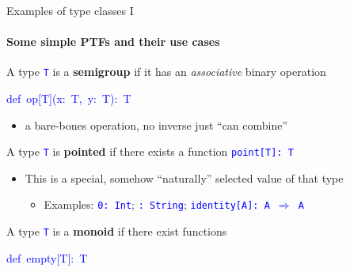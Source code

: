 \documentclass[english]{beamer}
\newenvironment{lyxcode}
   {\par\begin{list}{}{
     \setlength{\rightmargin}{\leftmargin}
     \setlength{\listparindent}{0pt}%
     \raggedright
     \setlength{\itemsep}{0pt}
     \setlength{\parsep}{0pt}
     \normalfont\ttfamily}%
    \def\{{\char`\{}
    \def\}{\char`\}}
    \def\textasciitilde{\char`\~}
    \item[]}
   {\end{list}}
\begin{document}
\begin{frame}{Examples of type classes I}


\framesubtitle{Some simple PTFs and their use cases}
\begin{itemize}
\item A type \texttt{\textcolor{blue}{\footnotesize{}T}} is a \textbf{semigroup}
if it has an \emph{associative} binary operation
\begin{lyxcode}
\textcolor{blue}{\footnotesize{}def~op{[}T{]}(x:~T,~y:~T):~T}{\footnotesize \par}
\end{lyxcode}
\begin{itemize}
\item a bare-bones operation, no inverse \textendash{} just ``can combine'' 
\end{itemize}
\item A type \texttt{\textcolor{blue}{\footnotesize{}T}} is \textbf{pointed}
if there exists a function \texttt{\textcolor{blue}{\footnotesize{}point{[}T{]}:\ T}}{\footnotesize \par}
\begin{itemize}
\item This is a special, somehow ``naturally'' selected value of that
type
\begin{itemize}
\item Examples: \texttt{\textcolor{blue}{\footnotesize{}0:\ Int}}; \texttt{\textcolor{blue}{\footnotesize{}\textquotedbl{}\textquotedbl{}:\ String}};
\texttt{\textcolor{blue}{\footnotesize{}identity{[}A{]}:\ A $\Rightarrow$
A}}{\footnotesize \par}
\end{itemize}
\end{itemize}
\item A type \texttt{\textcolor{blue}{\footnotesize{}T}} is a \textbf{monoid}
if there exist functions
\begin{lyxcode}
\textcolor{blue}{\footnotesize{}def~empty{[}T{]}:~T}{\footnotesize \par}


\end{lyxcode}
\end{itemize}
\end{frame}
\end{document}
